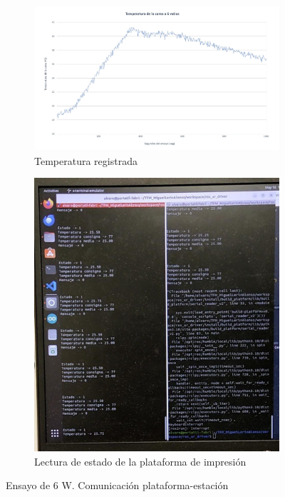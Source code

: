 \begin{figure}[H]
    \centering
     \begin{subfigure}[h]{0.45\linewidth} 
        \centering
        \includegraphics[scale=0.15]{figuras/ensayo plataforma impresion 6 W.jpeg}
        \caption{Temperatura registrada}
        \label{fig: ensayo plataforma impresion 6 W}
    \end{subfigure}
    \begin{subfigure}[h]{0.45\linewidth} 
        \centering
        \includegraphics[scale=0.14]{figuras/lectura estado plataforma impresion.jpeg}
        \caption{Lectura de estado de la plataforma de impresión}
        \label{fig: lectura estado plataforma impresion}
    \end{subfigure}
    \caption{Ensayo de 6 W. Comunicación plataforma-estación}
    \label{fig: Ensayo plataforma impresion 6 W lectura estado}
\end{figure}

